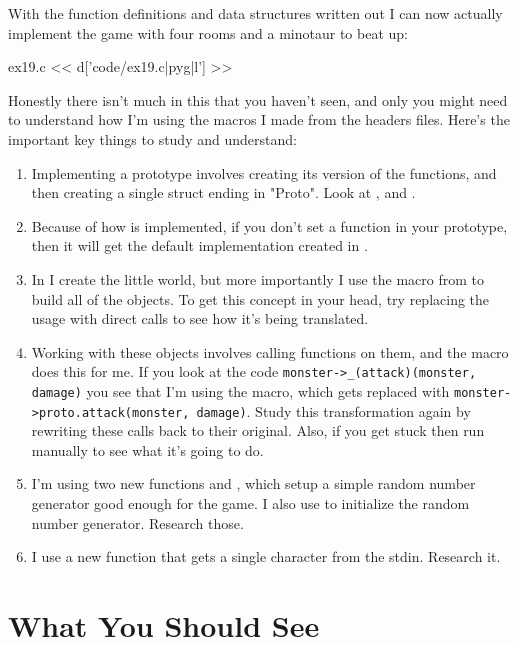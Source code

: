 With the function definitions and data structures written out I can now
actually implement the game with four rooms and a minotaur to beat up:

\begin{code}{ex19.c}
<< d['code/ex19.c|pyg|l'] >>
\end{code}

Honestly there isn't much in this that you haven't seen, and only you might
need to understand how I'm using the macros I made from the headers files.
Here's the important key things to study and understand:

\begin{enumerate}
\item Implementing a prototype involves creating its version of the
    functions, and then creating a single struct ending in "Proto".
    Look at ,  and .
\item Because of how  is implemented, if you don't set
    a function in your prototype, then it will get the default implementation
    created in .
\item In  I create the little world, but more importantly
    I use the  macro from  to build all of the
    objects.  To get this concept in your head, try replacing the 
    usage with direct  calls to see how it's being
    translated.
\item Working with these objects involves calling functions on them, and the
     macro does this for me.  If you look at the code
    \verb|monster->_(attack)(monster, damage)| you see that I'm using the
    macro, which gets replaced with \verb|monster->proto.attack(monster, damage)|.
    Study this transformation again by rewriting these calls back to their 
    original.  Also, if you get stuck then run  manually to see what it's
    going to do.
\item I'm using two new functions  and , which setup
    a simple random number generator good enough for the game.  I also use
     to initialize the random number generator.  Research those.
\item I use a new function  that gets a single character
    from the stdin.  Research it.
\end{enumerate}


\section{What You Should See}

